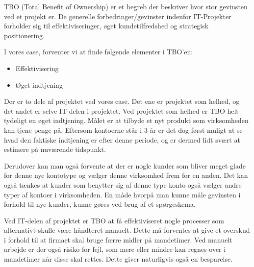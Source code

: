 TBO (Total Benefit of Ownership) er et begreb der beskriver hvor stor gevinsten
ved et projekt er. De generelle forbedringer/gevinster indenfor IT-Projekter
forholder sig til effektiviseringer, øget kundetilfredshed og strategisk
positionering.

I vores case, forventer vi at finde følgende elementer i TBO'en:

\begin{itemize}
  \item Effektivisering
  \item Øget indtjening
\end{itemize}

Der er to dele af projektet ved vores case. Det ene er projektet som helhed, og
det andet er selve IT-delen i projektet. Ved projektet som helhed er TBO helt
tydeligt en øget indtjening. Målet er at tilbyde et nyt produkt som virksomheden
kan tjene penge på. Eftersom kontoerne står i 3 år er det dog først muligt at
se hvad den faktiske indtjening er efter denne periode, og er dermed lidt svært
at estimere på nuværende tidspunkt.

Derudover kan man også forvente at der er nogle kunder som bliver meget glade
for denne nye kontotype og vælger denne virksomhed frem for en anden. Det kan
også tænkes at kunder som benytter sig af denne type konto også vælger andre
typer af kontoer i virksomheden. En måde hvorpå man kunne måle gevinsten i
forhold til nye kunder, kunne gøres ved brug af et spørgeskema.

Ved IT-delen af projektet er TBO at få effektiviseret nogle processer som
alternativt skulle være håndteret manuelt. Dette må forventes at give et
overskud i forhold til at firmaet skal bruge færre midler på mandetimer. Ved
manuelt arbejde er der også risiko for fejl, som mere eller mindre kan regnes
over i mandetimer når disse skal rettes. Dette giver naturligvis også en
besparelse.
